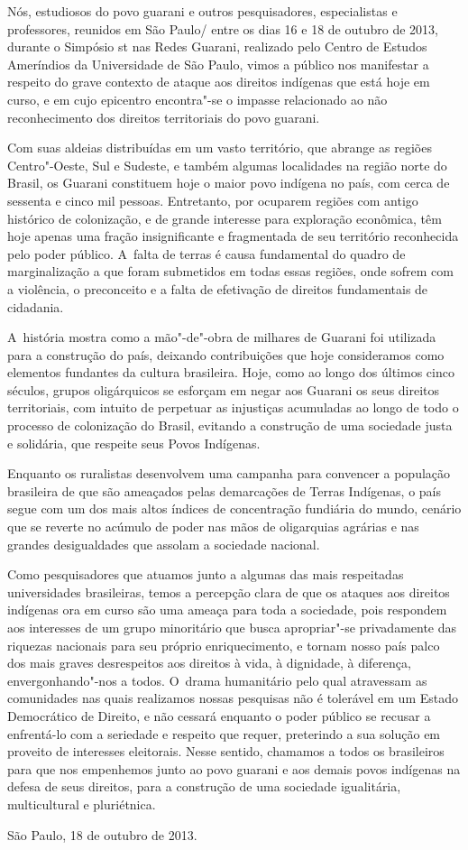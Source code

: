 Nós, estudiosos do povo guarani e outros pesquisadores, especialistas e
professores, reunidos em São Paulo/ entre os dias 16 e 18 de outubro
de 2013, durante o Simpósio st nas Redes Guarani, realizado pelo
Centro de Estudos Ameríndios da Universidade de São Paulo, vimos a
público nos manifestar a respeito do grave contexto de ataque aos
direitos indígenas que está hoje em curso, e em cujo epicentro
encontra"-se o impasse relacionado ao não reconhecimento dos direitos
territoriais do povo guarani.

Com suas aldeias distribuídas em um vasto território, que abrange as
regiões Centro"-Oeste, Sul e Sudeste, e também algumas localidades na
região norte do Brasil, os Guarani constituem hoje o maior povo
indígena no país, com cerca de sessenta e cinco mil pessoas.
Entretanto, por ocuparem regiões com antigo histórico de colonização, e
de grande interesse para exploração econômica, têm hoje apenas uma
fração insignificante e fragmentada de seu território reconhecida pelo
poder público. A~falta de terras é causa fundamental do quadro de
marginalização a que foram submetidos em todas essas regiões, onde
sofrem com a violência, o preconceito e a falta de efetivação de
direitos fundamentais de cidadania. 

A~história mostra como a mão"-de"-obra de milhares de Guarani foi
utilizada para a construção do país, deixando contribuições que hoje
consideramos como elementos fundantes da cultura brasileira. Hoje, como
ao longo dos últimos cinco séculos, grupos oligárquicos se esforçam em
negar aos Guarani os seus direitos territoriais, com intuito de
perpetuar as injustiças acumuladas ao longo de todo o processo de
colonização do Brasil, evitando a construção de uma sociedade justa e
solidária, que respeite seus Povos Indígenas.

Enquanto os ruralistas desenvolvem uma campanha para convencer a
população brasileira de que são ameaçados pelas demarcações de Terras
Indígenas, o país segue com um dos mais altos índices de concentração
fundiária do mundo, cenário que se reverte no acúmulo de poder nas mãos
de oligarquias agrárias e nas grandes desigualdades que assolam a
sociedade nacional. 

Como pesquisadores que atuamos junto a algumas das mais respeitadas
universidades brasileiras, temos a percepção clara de que os ataques
aos direitos indígenas ora em curso são uma ameaça para toda a
sociedade, pois respondem aos interesses de um grupo minoritário que
busca apropriar"-se privadamente das riquezas nacionais para seu próprio
enriquecimento, e tornam nosso país palco dos mais graves desrespeitos
aos direitos à vida, à dignidade, à diferença, envergonhando"-nos a
todos. O~drama humanitário pelo qual atravessam as comunidades nas
quais realizamos nossas pesquisas não é tolerável em um Estado
Democrático de Direito, e não cessará enquanto o poder público se
recusar a enfrentá-lo com a seriedade e respeito que requer, preterindo
a sua solução em proveito de interesses eleitorais. Nesse sentido,
chamamos a todos os brasileiros para que nos empenhemos junto ao povo
guarani e aos demais povos indígenas na defesa de seus direitos, para a
construção de uma sociedade igualitária, multicultural e pluriétnica.

\begin{flushright}
São Paulo, 18 de outubro de 2013.
\end{flushright}
